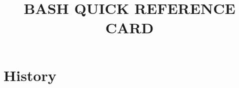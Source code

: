 \def\cmdFooBar#1{{\tt#1}\null}	%

\def\cmd#1#2{
  \noindent
  \hbox to \hsize {%
    \vtop{
      \hbox to 2.4cm {
        \noindent\cmdFooBar{#1}\dotfill
      }
    }%
    \hfil	%
    \vtop{
      \hsize=5.90cm
      \hbox{\hfuzz = 15pt \vtop{
      {#2}
      }}
    }
  }
  \par
  \vskip 0.14cm
}

\def\cmdExample#1#2#3{
      \hbox to 1.4cm {
      \hskip 14pt
      \noindent\cmdFooBar{\it#1}
      }
      \hbox to 2.4cm {
      \hskip 14pt
      \noindent\cmdFooBar{\it#2}
      }
}

\def\cmdOpt#1#2{
  \noindent
  \hbox to \hsize {%
    \vtop{
      \hbox to 1.7cm {
      \hskip 14pt
      \noindent\cmdFooBar{\it#1}
      }
    }%
    \hfil	%
    \vtop{
      \hsize=5.90cm
      \hbox{\hfuzz = 15pt \vtop{
      \it{#2}
      }}
    }
  }
  \par
  \vskip 0.14cm
}

\def\cmdL#1#2{
  \hsize=8.5cm
  \vbox {
    \hbox{
        \cmdFooBar{#1}\hfil
    }%
    \hskip 2.5cm  %
    \hbox to 5.9cm {%
      \hfuzz = 5pt
      \hfil
      \hsize=5.9cm
      \vtop{
        {#2}
        }}
  }%
  \par
  \vskip 0.14cm
}
\title{BASH QUICK REFERENCE CARD}

\shortcopyrightnotice

\section{History}

